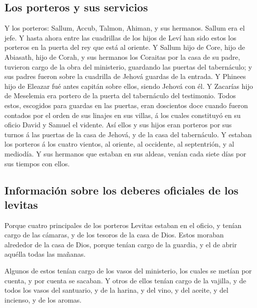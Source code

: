\hypertarget{los-porteros-y-sus-servicios}{%
\subsection{Los porteros y sus
servicios}\label{los-porteros-y-sus-servicios}}

 Y los porteros: Sallum, Accub, Talmon, Ahiman, y sus
hermanos. Sallum era el jefe.  Y hasta ahora entre las
cuadrillas de los hijos de Leví han sido estos los porteros en la puerta
del rey que está al oriente.  Y Sallum hijo de Core, hijo
de Abiasath, hijo de Corah, y sus hermanos los Coraitas por la casa de
su padre, tuvieron cargo de la obra del ministerio, guardando las
puertas del tabernáculo; y sus padres fueron sobre la cuadrilla de
Jehová guardas de la entrada.  Y Phinees hijo de Eleazar
fué antes capitán sobre ellos, siendo Jehová con él.  Y
Zacarías hijo de Meselemia era portero de la puerta del tabernáculo del
testimonio.  Todos estos, escogidos para guardas en las
puertas, eran doscientos doce cuando fueron contados por el orden de sus
linajes en sus villas, á los cuales constituyó en su oficio David y
Samuel el vidente.  Así ellos y sus hijos eran porteros por
sus turnos á las puertas de la casa de Jehová, y de la casa del
tabernáculo.  Y estaban los porteros á los cuatro vientos,
al oriente, al occidente, al septentrión, y al mediodía.  Y
sus hermanos que estaban en sus aldeas, venían cada siete días por sus
tiempos con ellos.

\hypertarget{informaciuxf3n-sobre-los-deberes-oficiales-de-los-levitas}{%
\subsection{Información sobre los deberes oficiales de los
levitas}\label{informaciuxf3n-sobre-los-deberes-oficiales-de-los-levitas}}

 Porque cuatro principales de los porteros Levitas estaban
en el oficio, y tenían cargo de las cámaras, y de los tesoros de la casa
de Dios.  Estos moraban alrededor de la casa de Dios,
porque tenían cargo de la guardia, y el de abrir aquélla todas las
mañanas.

 Algunos de estos tenían cargo de los vasos del ministerio,
los cuales se metían por cuenta, y por cuenta se sacaban. 
Y otros de ellos tenían cargo de la vajilla, y de todos los vasos del
santuario, y de la harina, y del vino, y del aceite, y del incienso, y
de los aromas.

